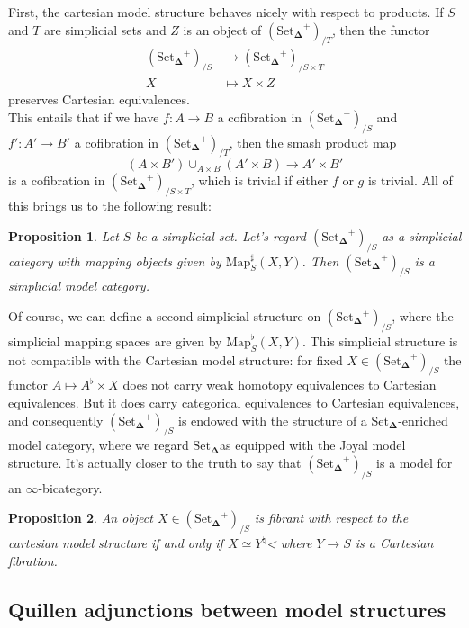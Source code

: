 \documentclass{amsart}
\newcommand{\8}{\ensuremath{\infty}}
\newcommand{\SSet}{\ensuremath{\text{Set}_{\boldsymbol{\Delta}}}}
\newcommand{\Map}{\ensuremath{\text{Map}}}
\newtheorem{proposition}{Proposition}
\begin{document}
First, the cartesian model structure behaves nicely with respect to products. If $S$ and $T$ are simplicial sets and $Z$ is an object of $(\SSet^+)_{/T}$, then the functor\begin{align*}(\SSet^+)_{/S} & \rightarrow (\SSet^+)_{/S\times T} \\
  X              & \mapsto X\times Z\end{align*}
preserves Cartesian equivalences.\\
This entails that if we have $f:A\rightarrow B$ a cofibration in $(\SSet^+)_{/S}$ and $f':A'\rightarrow B'$ a cofibration in $(\SSet^+)_{/T}$, then the smash product map
\[(A\times B')\displaystyle \cup_{A\times B}(A'\times B)\rightarrow A'\times B'\] is a cofibration in $(\SSet^+)_{/S\times T}$, which is trivial if either $f$ or $g$ is trivial. All of this brings us to the following result:

\begin{proposition}
  Let $S$ be a simplicial set. Let's regard $(\SSet^+)_{/S}$ as a simplicial category with mapping objects given by $\Map^\sharp_S(X,Y)$. Then $(\SSet^+)_{/S}$ is a simplicial model category.
\end{proposition}

Of course, we can define a second simplicial structure on $(\SSet^+)_{/S}$, where the simplicial mapping spaces are given by $\Map^\flat_S(X,Y)$. This simplicial structure is not compatible with the Cartesian model structure: for fixed $X\in(\SSet^+)_{/S}$ the functor $A\mapsto A^\flat\times X$ does not carry weak homotopy equivalences to Cartesian equivalences. But it does carry categorical equivalences to Cartesian equivalences, and consequently $(\SSet^+)_{/S}$ is endowed with the structure of a \SSet-enriched model category, where we regard \SSet as equipped with the Joyal model structure. It's actually closer to the truth to say that $(\SSet^+)_{/S}$ is a model for an \8-bicategory.


\begin{proposition}
  An object $X\in(\SSet^+)_{/S}$ is fibrant with respect to the cartesian model structure if and only if $X\simeq Y^\natural$< where $Y\rightarrow S$ is a Cartesian fibration.
\end{proposition}

\subsection{Quillen adjunctions between model structures}
\end{document}
